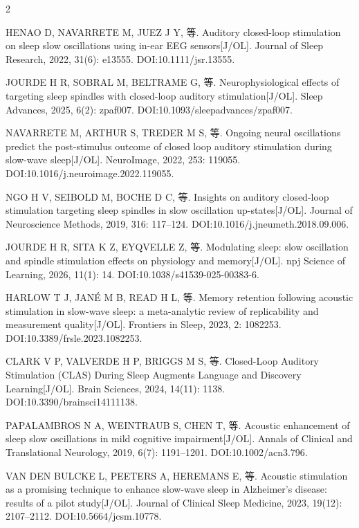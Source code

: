 \documentclass[UTF8,zihao=5,fontset=none]{ctexart}
\begin{document}
\begin{multicols}{2}
{\makebox[25.2pt][l]{[76]}HENAO D, NAVARRETE M, JUEZ J Y, 等. Auditory closed-loop stimulation on sleep slow oscillations using in-ear EEG sensors[J/OL]. Journal of Sleep Research, 2022, 31(6): e13555. DOI:10.1111/jsr.13555.\par
\makebox[25.2pt][l]{[77]}JOURDE H R, SOBRAL M, BELTRAME G, 等. Neurophysiological effects of targeting sleep spindles with closed-loop auditory stimulation[J/OL]. Sleep Advances, 2025, 6(2): zpaf007. DOI:10.1093/sleepadvances/zpaf007.\par
\makebox[25.2pt][l]{[78]}NAVARRETE M, ARTHUR S, TREDER M S, 等. Ongoing neural oscillations predict the post-stimulus outcome of closed loop auditory stimulation during slow-wave sleep[J/OL]. NeuroImage, 2022, 253: 119055. DOI:10.1016/j.neuroimage.2022.119055.\par
\makebox[25.2pt][l]{[79]}NGO H V, SEIBOLD M, BOCHE D C, 等. Insights on auditory closed-loop stimulation targeting sleep spindles in slow oscillation up-states[J/OL]. Journal of Neuroscience Methods, 2019, 316: 117--124. DOI:10.1016/j.jneumeth.2018.09.006.\par
\makebox[25.2pt][l]{[80]}JOURDE H R, SITA K Z, EYQVELLE Z, 等. Modulating sleep: slow oscillation and spindle stimulation effects on physiology and memory[J/OL]. npj Science of Learning, 2026, 11(1): 14. DOI:10.1038/s41539-025-00383-6.\par
\makebox[25.2pt][l]{[81]}HARLOW T J, JANÉ M B, READ H L, 等. Memory retention following acoustic stimulation in slow-wave sleep: a meta-analytic review of replicability and measurement quality[J/OL]. Frontiers in Sleep, 2023, 2: 1082253. DOI:10.3389/frsle.2023.1082253.\par
\makebox[25.2pt][l]{[82]}CLARK V P, VALVERDE H P, BRIGGS M S, 等. Closed-Loop Auditory Stimulation (CLAS) During Sleep Augments Language and Discovery Learning[J/OL]. Brain Sciences, 2024, 14(11): 1138. DOI:10.3390/brainsci14111138.\par
\makebox[25.2pt][l]{[83]}PAPALAMBROS N A, WEINTRAUB S, CHEN T, 等. Acoustic enhancement of sleep slow oscillations in mild cognitive impairment[J/OL]. Annals of Clinical and Translational Neurology, 2019, 6(7): 1191--1201. DOI:10.1002/acn3.796.\par
\makebox[25.2pt][l]{[84]}VAN DEN BULCKE L, PEETERS A, HEREMANS E, 等. Acoustic stimulation as a promising technique to enhance slow-wave sleep in Alzheimer’s disease: results of a pilot study[J/OL]. Journal of Clinical Sleep Medicine, 2023, 19(12): 2107--2112. DOI:10.5664/jcsm.10778.\par
}
\end{multicols}
\end{document}
